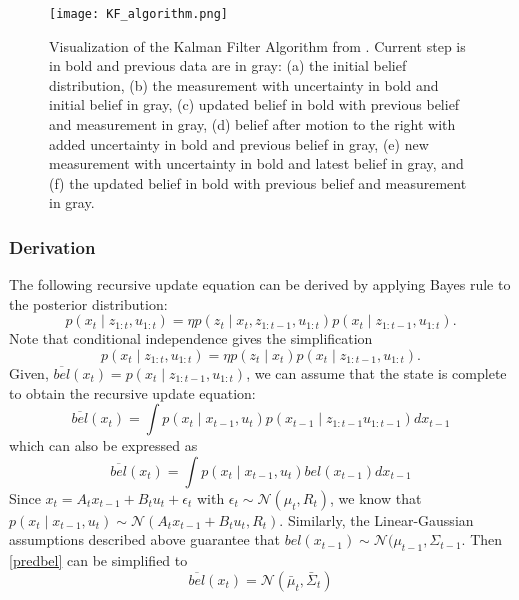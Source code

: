 \documentclass[twoside]{article}
\begin{document}
\begin{figure}[tp]
\centering
\texttt{[image: KF\_algorithm.png]}
\caption{Visualization of the Kalman Filter Algorithm from \cite{thrun2005probabilistic}. Current step is in bold and previous data are in gray: (a) the initial belief distribution, (b) the measurement with uncertainty in bold and initial belief in gray, (c) updated belief in bold with previous belief and measurement in gray, (d) belief after motion to the right with added uncertainty in bold and previous belief in gray, (e) new measurement with uncertainty in bold and latest belief in gray, and (f) the updated belief in bold with previous belief and measurement in gray.}
\label{fig:KF_algorithm}
\end{figure}

\subsubsection{Derivation}
The following recursive update equation can be derived by applying Bayes rule to the posterior distribution:
\begin{equation}
p(x_t \mid z_{1:t}, u_{1:t}) = \eta p(z_t \mid x_t, z_{1:t-1}, u_{1:t})p(x_t \mid z_{1:t-1}, u_{1:t}).
\end{equation} Note that conditional independence gives the simplification
\begin{equation}
p(x_t \mid z_{1:t}, u_{1:t}) = \eta p(z_t \mid x_t)p(x_t \mid z_{1:t-1}, u_{1:t}). \label{predbel0}
\end{equation}
Given, $\overline{bel}(x_t) = p(x_t \mid z_{1:t-1},u_{1:t})$, we can assume that the state is complete to obtain the recursive update equation:
\begin{equation}
\overline{bel}(x_t) = \int p(x_t \mid x_{t-1}, u_t) p(x_{t-1} \mid z_{1:t-1}u_{1:t-1}) dx_{t-1}
\end{equation}
which can also be expressed as
\begin{equation}
\overline{bel}(x_t) = \int p(x_t \mid x_{t-1}, u_t) bel(x_{t-1}) dx_{t-1} \label{predbel}
\end{equation}
Since $x_t = A_tx_{t-1} + B_tu_t + \epsilon_t$ with $\epsilon_t \sim \mathcal{N}(\mu_t, R_t)$, we know that $p(x_t \mid x_{t-1}, u_t) \sim \mathcal{N}(A_tx_{t-1} + B_tu_t, R_t)$. Similarly, the Linear-Gaussian assumptions described above guarantee that $bel(x_{t-1}) \sim \mathcal{N}(\mu_{t-1}, \Sigma_{t-1}$. Then \eqref{predbel} can be simplified to
\begin{equation}
\overline{bel}(x_t) = \mathcal{N}(\bar{\mu}_t, \bar{\Sigma}_t) \label{predbel2}
\end{equation}
\end{document}
